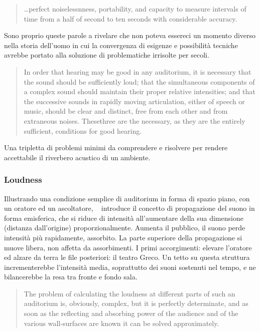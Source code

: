 \begin{refsection}
\begin{quote}
  \ldots perfect noiselessnness, portability, and capacity to measure intervals
  of time from a half of second to ten seconds with considerable accuracy. \cite{ws:rev}
\end{quote}

Sono proprio queste parole a rivelare che non poteva essereci un momento diverso
nella storia dell'uomo in cui la convergenza di esigenze e possibilità tecniche
avrebbe portato alla soluzione di problematiche irrisolte per secoli.

\begin{quote}
  In order that hearing may be good in any auditorium, it is necessary that the
  sound should be sufficiently loud; that the simultaneous components of a
  complex sound should maintain their proper relative intensities;
  and that the successive sounds in rapidly moving articulation, either of speech
  or music, should be clear and distinct, free from each other and from extraneous
  noises. Thesethree are the necessary, as they are the entirely sufficient,
  conditions for good hearing. \cite{ws:rev}
\end{quote}

Una tripletta di problemi minimi da comprendere e risolvere per rendere accettabile
il riverbero acustico di un ambiente.

\subsubsection{Loudness}

Illustrando una condizione semplice di auditorium in forma di spazio piano,
con un oratore ed un ascoltatore, \ws~ introduce il concetto di propagazione
del suono in forma emisferica, che si riduce di intensità all'aumentare della
sua dimensione (distanza dall'origine) proporzionalmente. Aumenta il pubblico,
il suono perde intensità più rapidamente, assorbito. La parte superiore della
propagazione si muove libera, non affetta da assorbimenti. I primi accorgimenti:
elevare l'oratore ed alzare da terra le file posteriori: il teatro Greco. Un tetto
su questa struttura incrementerebbe l'intensità media, soprattutto dei suoni
sostenuti nel tempo, e ne bilancerebbe la resa tra fronte e fondo sala.

\begin{quote}
  The problem of calculating the loudness at different parts of such an
  auditorium is, obviously, complex, but it is perfectly determinate, and as
  soon as the reflecting and absorbing power of the audience and of the various
  wall-surfaces are known it can be solved approximately. \cite{ws:rev}
\end{quote}


\end{refsection}

